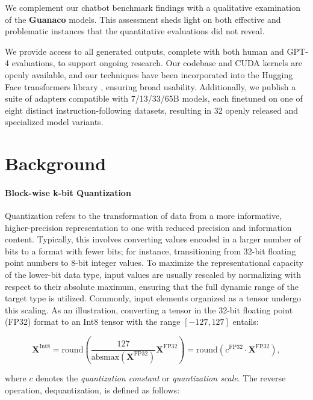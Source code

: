 We complement our chatbot benchmark findings with a qualitative examination of the \textbf{Guanaco} models. This assessment sheds light on both effective and problematic instances that the quantitative evaluations did not reveal.

We provide access to all generated outputs, complete with both human and GPT-4 evaluations, to support ongoing research. Our codebase and CUDA kernels are openly available, and our techniques have been incorporated into the Hugging Face transformers library \citep{wolf2019huggingface}, ensuring broad usability. Additionally, we publish a suite of adapters compatible with 7/13/33/65B models, each finetuned on one of eight distinct instruction-following datasets, resulting in 32 openly released and specialized model variants.

\section{Background}
\paragraph{Block-wise k-bit Quantization} Quantization refers to the transformation of data from a more informative, higher-precision representation to one with reduced precision and information content. Typically, this involves converting values encoded in a larger number of bits to a format with fewer bits; for instance, transitioning from 32-bit floating point numbers to 8-bit integer values. To maximize the representational capacity of the lower-bit data type, input values are usually rescaled by normalizing with respect to their absolute maximum, ensuring that the full dynamic range of the target type is utilized. Commonly, input elements organized as a tensor undergo this scaling. As an illustration, converting a tensor in the 32-bit floating point (FP32) format to an Int8 tensor with the range $[-127, 127]$ entails:

\begin{equation}
    \mathbf{X}^{ \text{Int8}} = \text{round}\left( \frac{127}{{\text{absmax}}(\mathbf{X}^{{\text{FP32}}})}\mathbf{X}^{{\text{FP32}}} \right) = \text{round}(c^{\text{FP32}}\cdot \mathbf{X}^{{\text{FP32}}}),
\end{equation}

where $c$ denotes the {\em quantization constant} or {\em quantization scale}. The reverse operation, dequantization, is defined as follows:

